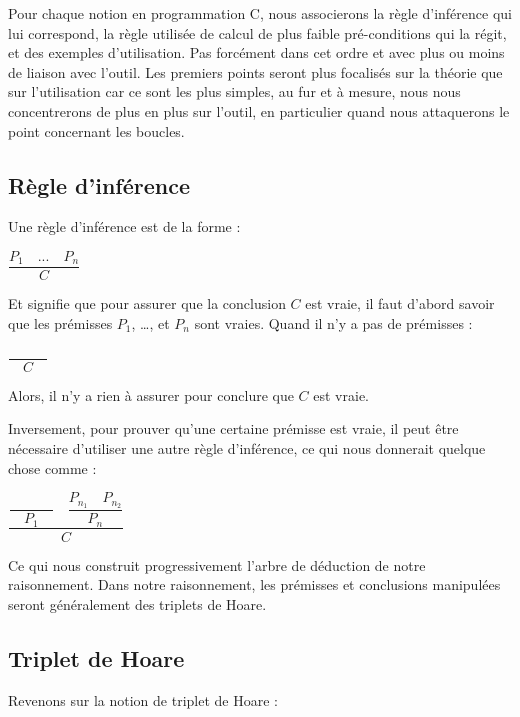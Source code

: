 \documentclass[12pt,francais,]{scrbook}
\begin{document}
Pour chaque notion en programmation C, nous associerons la règle
d'inférence qui lui correspond, la règle utilisée de calcul de plus
faible pré-conditions qui la régit, et des exemples d'utilisation. Pas
forcément dans cet ordre et avec plus ou moins de liaison avec l'outil.
Les premiers points seront plus focalisés sur la théorie que sur
l'utilisation car ce sont les plus simples, au fur et à mesure, nous
nous concentrerons de plus en plus sur l'outil, en particulier quand
nous attaquerons le point concernant les boucles.

\subsection{Règle d'inférence}\label{ruxe8gle-dinfuxe9rence}

Une règle d'inférence est de la forme :

\begin{center} \(\dfrac{P_1 \quad ... \quad P_n}{C}\) \end{center}

Et signifie que pour assurer que la conclusion \(C\) est vraie, il faut
d'abord savoir que les prémisses \(P_1\), \ldots{}, et \(P_n\) sont
vraies. Quand il n'y a pas de prémisses :

\begin{center} \(\dfrac{}{\quad C \quad}\) \end{center}

Alors, il n'y a rien à assurer pour conclure que \(C\) est vraie.

Inversement, pour prouver qu'une certaine prémisse est vraie, il peut
être nécessaire d'utiliser une autre règle d'inférence, ce qui nous
donnerait quelque chose comme :

\begin{center}
\(\dfrac{\dfrac{}{\quad P_1\quad} \quad \dfrac{P_{n_1}\quad P_{n_2}}{P_n}}{C}\)
\end{center}

Ce qui nous construit progressivement l'arbre de déduction de notre
raisonnement. Dans notre raisonnement, les prémisses et conclusions
manipulées seront généralement des triplets de Hoare.

\subsection{Triplet de Hoare}\label{triplet-de-hoare}

Revenons sur la notion de triplet de Hoare :
\end{document}
